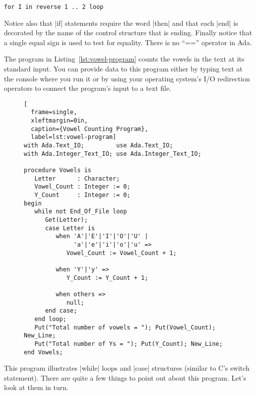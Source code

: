 \begin{lstlisting}
for I in reverse 1 .. 2 loop
\end{lstlisting}

Notice also that |if| statements require the word |then| and that each |end| is decorated by the
name of the control structure that is ending. Finally notice that a single equal sign is used to
test for equality. There is no ``=='' operator in Ada.

The program in Listing~\ref{lst:vowel-program} counts the vowels in the text at its standard
input. You can provide data to this program either by typing text at the console where you run
it or by using your operating system's I/O redirection operators to connect the program's input
to a text file.

\begin{figure}[tbhp]
\begin{lstlisting}[
  frame=single,
  xleftmargin=0in,
  caption={Vowel Counting Program},
  label=lst:vowel-program]
with Ada.Text_IO;         use Ada.Text_IO;
with Ada.Integer_Text_IO; use Ada.Integer_Text_IO;

procedure Vowels is
   Letter      : Character;
   Vowel_Count : Integer := 0;
   Y_Count     : Integer := 0;
begin
   while not End_Of_File loop
      Get(Letter);
      case Letter is
         when 'A'|'E'|'I'|'O'|'U' |
              'a'|'e'|'i'|'o'|'u' =>
            Vowel_Count := Vowel_Count + 1;
            
         when 'Y'|'y' =>
            Y_Count := Y_Count + 1;
            
         when others =>
            null;
      end case;
   end loop;
   Put("Total number of vowels = "); Put(Vowel_Count); New_Line;
   Put("Total number of Ys = "); Put(Y_Count); New_Line;
end Vowels;
\end{lstlisting}
\end{figure}

This program illustrates |while| loops and |case| structures (similar to C's switch statement).
There are quite a few things to point out about this program. Let's look at them in turn.

